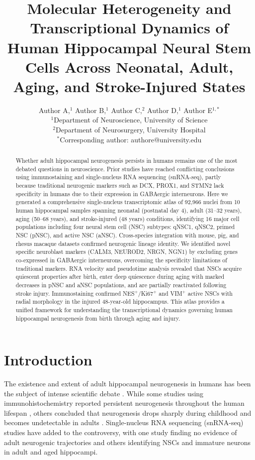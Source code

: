 \documentclass[11pt]{article}
\title{Molecular Heterogeneity and Transcriptional Dynamics of Human Hippocampal Neural Stem Cells Across Neonatal, Adult, Aging, and Stroke-Injured States}
\author{Author A,$^{1}$ Author B,$^{1}$ Author C,$^{2}$ Author D,$^{1}$ Author E$^{1,*}$\\
\small $^{1}$Department of Neuroscience, University of Science\\
\small $^{2}$Department of Neurosurgery, University Hospital\\
\small $^{*}$Corresponding author: authore@university.edu}
\date{}
\begin{document}
\maketitle

\begin{abstract}
Whether adult hippocampal neurogenesis persists in humans remains one of the most debated questions in neuroscience. Prior studies have reached conflicting conclusions using immunostaining and single-nucleus RNA sequencing (snRNA-seq), partly because traditional neurogenic markers such as DCX, PROX1, and STMN2 lack specificity in humans due to their expression in GABAergic interneurons. Here we generated a comprehensive single-nucleus transcriptomic atlas of 92,966 nuclei from 10 human hippocampal samples spanning neonatal (postnatal day 4), adult (31--32 years), aging (50--68 years), and stroke-injured (48 years) conditions, identifying 16 major cell populations including four neural stem cell (NSC) subtypes: qNSC1, qNSC2, primed NSC (pNSC), and active NSC (aNSC). Cross-species integration with mouse, pig, and rhesus macaque datasets confirmed neurogenic lineage identity. We identified novel specific neuroblast markers (CALM3, NEUROD2, NRGN, NGN1) by excluding genes co-expressed in GABAergic interneurons, overcoming the specificity limitations of traditional markers. RNA velocity and pseudotime analysis revealed that NSCs acquire quiescent properties after birth, enter deep quiescence during aging with marked decreases in pNSC and aNSC populations, and are partially reactivated following stroke injury. Immunostaining confirmed NES$^+$/Ki67$^+$ and VIM$^+$ active NSCs with radial morphology in the injured 48-year-old hippocampus. This atlas provides a unified framework for understanding the transcriptional dynamics governing human hippocampal neurogenesis from birth through aging and injury.
\end{abstract}

\section{Introduction}

The existence and extent of adult hippocampal neurogenesis in humans has been the subject of intense scientific debate \citep{eriksson1998neurogenesis, spalding2013dynamics}. While some studies using immunohistochemistry reported persistent neurogenesis throughout the human lifespan \citep{boldrini2018human, moreno2015neuronal}, others concluded that neurogenesis drops sharply during childhood and becomes undetectable in adults \citep{sorrells2018human}. Single-nucleus RNA sequencing (snRNA-seq) studies have added to the controversy, with one study finding no evidence of adult neurogenic trajectories and others identifying NSCs and immature neurons in adult and aged hippocampi.
\end{document}
